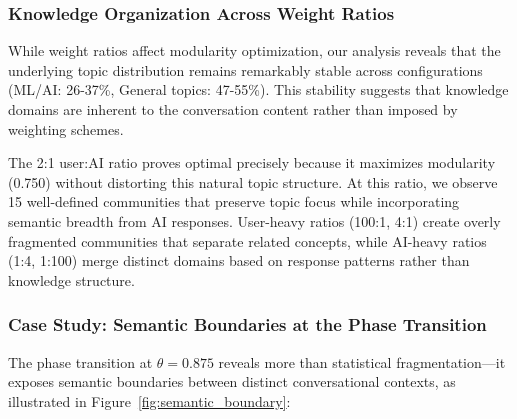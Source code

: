 \documentclass{svproc}
\begin{document}
\subsubsection{Knowledge Organization Across Weight Ratios}

While weight ratios affect modularity optimization, our analysis reveals that the underlying topic distribution remains remarkably stable across configurations (ML/AI: 26-37\%, General topics: 47-55\%). This stability suggests that knowledge domains are inherent to the conversation content rather than imposed by weighting schemes. 

The 2:1 user:AI ratio proves optimal precisely because it maximizes modularity (0.750) without distorting this natural topic structure. At this ratio, we observe 15 well-defined communities that preserve topic focus while incorporating semantic breadth from AI responses. User-heavy ratios (100:1, 4:1) create overly fragmented communities that separate related concepts, while AI-heavy ratios (1:4, 1:100) merge distinct domains based on response patterns rather than knowledge structure.

\subsubsection{Case Study: Semantic Boundaries at the Phase Transition}

The phase transition at $\theta = 0.875$ reveals more than statistical fragmentation—it exposes semantic boundaries between distinct conversational contexts, as illustrated in Figure~\ref{fig:semantic_boundary}:
\end{document}
